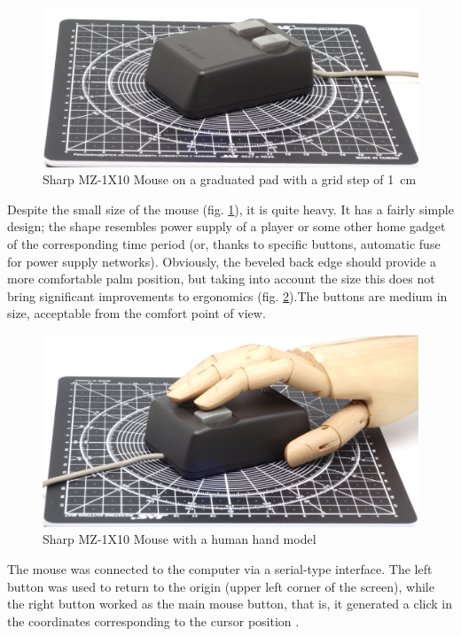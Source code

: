 \documentclass[11pt, a4paper]{article}
\begin{document}
\begin{figure}[h]
    \centering
    \includegraphics[scale=0.5]{1983_sharp_mz_1x10_mouse/size_30.jpg}
    \caption{Sharp MZ-1X10 Mouse on a graduated pad with a grid step of 1~cm}
    \label{fig:SharpMZ1x10Size}
\end{figure}

Despite the small size of the mouse (fig. \ref{fig:SharpMZ1x10Size}), it is quite heavy. It has a fairly simple design; the shape resembles power supply of a player or some other home gadget of the corresponding time period (or, thanks to specific buttons, automatic fuse for power supply networks). Obviously, the beveled back edge should provide a more comfortable palm position, but taking into account the size this does not bring significant improvements to ergonomics (fig. \ref{fig:SharpMZ1x10Hand}).The buttons are medium in size, acceptable from the comfort point of view.

\begin{figure}[h]
    \centering
    \includegraphics[scale=0.5]{1983_sharp_mz_1x10_mouse/hand_30.jpg}
    \caption{Sharp MZ-1X10 Mouse with a human hand model}
    \label{fig:SharpMZ1x10Hand}
\end{figure}

The mouse was connected to the computer via a serial-type interface. The left button was used to return to the origin (upper left corner of the screen), while the right button worked as the main mouse button, that is, it generated a click in the coordinates corresponding to the cursor position \cite{manual}.
\end{document}
